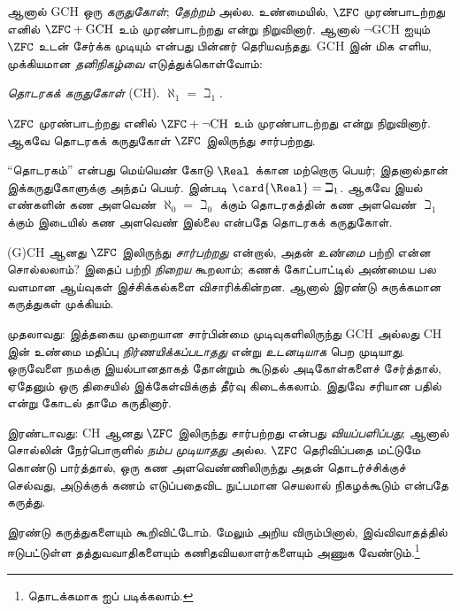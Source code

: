 \documentclass[../../../include/open-logic-section]{subfiles}
\begin{document}
ஆனால் GCH ஒரு \emph{கருதுகோள்}; \emph{தேற்றம்} அல்ல.
உண்மையில், $\ZFC$ முரண்பாடற்றது எனில்
$\ZFC + \text{GCH}$ உம் முரண்பாடற்றது என்று
\citet{Godel1938} நிறுவினார். ஆனால் $\lnot$GCH ஐயும்
$\ZFC$ உடன் சேர்க்க முடியும் என்பது பின்னர் தெரியவந்தது.
GCH இன் மிக எளிய, முக்கியமான \emph{தனிநிகழ்வை} எடுத்துக்கொள்வோம்:

\begin{defish}
\emph{தொடரகக் கருதுகோள்} (CH). $\aleph_1 = \beth_1$.
\end{defish}

$\ZFC$ முரண்பாடற்றது எனில் $\ZFC
+ \lnot\text{CH}$ உம் முரண்பாடற்றது என்று \citet{Cohen1963}
நிறுவினார். ஆகவே தொடரகக் கருதுகோள் $\ZFC$ இலிருந்து
சார்பற்றது.

``தொடரகம்'' என்பது மெய்யெண் கோடு $\Real$ க்கான மற்றொரு பெயர்;
இதனால்தான் இக்கருதுகோளுக்கு அந்தப் பெயர்.
 இன்படி
$\card{\Real} = \beth_1$. ஆகவே இயல் எண்களின் கண அளவெண்
$\aleph_0 = \beth_0$ க்கும் தொடரகத்தின் கண அளவெண்
$\beth_1$ க்கும் இடையில் கண அளவெண் இல்லை என்பதே தொடரகக்
கருதுகோள்.

(G)CH ஆனது $\ZFC$ இலிருந்து \emph{சார்பற்றது} என்றால்,
அதன் \emph{உண்மை} பற்றி என்ன சொல்லலாம்? இதைப் பற்றி
\emph{நிறைய} கூறலாம்; கணக் கோட்பாட்டில் அண்மைய பல வளமான
ஆய்வுகள் இச்சிக்கல்களை விசாரிக்கின்றன. ஆனால் இரண்டு சுருக்கமான
கருத்துகள் முக்கியம்.

முதலாவது: இத்தகைய முறையான சார்பின்மை முடிவுகளிலிருந்து GCH
அல்லது CH இன் உண்மை மதிப்பு \emph{நிர்ணயிக்கப்படாதது}
என்று \emph{உடனடியாக} பெற முடியாது. ஒருவேளை நமக்கு இயல்பானதாகத்
தோன்றும் கூடுதல் அடிகோள்களைச் சேர்த்தால், ஏதேனும் ஒரு திசையில்
இக்கேள்விக்குத் தீர்வு கிடைக்கலாம். இதுவே சரியான பதில் என்று
கோடல் தாமே கருதினார்.

இரண்டாவது: CH ஆனது $\ZFC$ இலிருந்து சார்பற்றது என்பது
\emph{வியப்பளிப்பது}; ஆனால் சொல்லின் நேர்பொருளில்
\emph{நம்ப முடியாதது} அல்ல. $\ZFC$ தெரிவிப்பதை மட்டுமே கொண்டு
பார்த்தால், ஒரு கண அளவெண்ணிலிருந்து அதன் தொடர்ச்சிக்குச்
செல்வது, அடுக்குக் கணம் எடுப்பதைவிட நுட்பமான செயலால்
நிகழக்கூடும் என்பதே கருத்து.

இரண்டு கருத்துகளையும் கூறிவிட்டோம். மேலும் அறிய விரும்பினால்,
இவ்விவாதத்தில் ஈடுபட்டுள்ள தத்துவவாதிகளையும் கணிதவியலாளர்களையும்
அணுக வேண்டும்.\footnote{தொடக்கமாக \citet[\S15.6]{Potter2004}
ஐப் படிக்கலாம்.}
\end{document}
